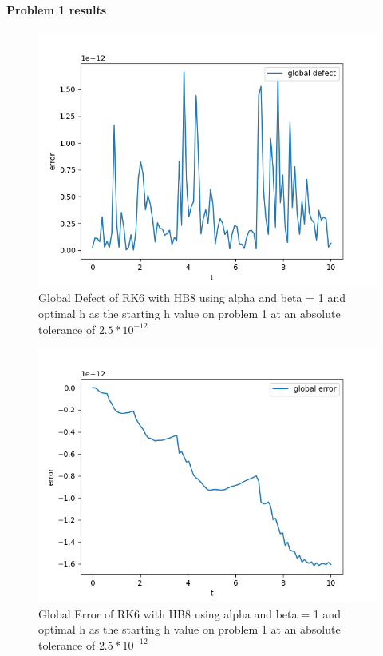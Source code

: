 \documentclass{article}
\begin{document}
\paragraph{Problem 1 results}
\begin{figure}[H]
\centering
\includegraphics[width=0.7\linewidth]{./figures/sharp_tolerance_rk6_with_hb8_p1_global_defect}
\caption{Global Defect of RK6 with HB8 using alpha and beta = 1 and optimal h as the starting h value on problem 1 at an absolute tolerance of $2.5*10^{-12}$}
\label{fig:sharp_tolerance_rk6_with_hb8_p1_global_defect}
\end{figure}

\begin{figure}[H]
\centering
\includegraphics[width=0.7\linewidth]{./figures/sharp_tolerance_rk6_with_hb8_p1_global_error}
\caption{Global Error of RK6 with HB8 using alpha and beta = 1 and optimal h as the starting h value on problem 1 at an absolute tolerance of $2.5*10^{-12}$}
\label{fig:sharp_tolerance_rk6_with_hb8_p1_global_error}
\end{figure}
\end{document}
